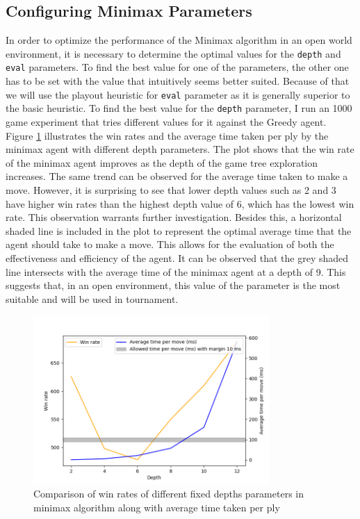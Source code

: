 \subsection{Configuring Minimax Parameters}

In order to optimize the performance of the Minimax algorithm in an open world environment, it is necessary to determine the optimal values for the \texttt{depth} and \texttt{eval} parameters. To find the best value for one of the parameters, the other one has to be set with the value that intuitively seems better suited. Because of that we will use the playout heuristic for \texttt{eval} parameter as it is generally superior to the basic heuristic. To find the best value for the \texttt{depth} parameter, I run an 1000 game experiment that tries different values for it against the Greedy agent. Figure \ref{minimaxOWDepth} illustrates the win rates and the average time taken per ply by the minimax agent with different depth parameters. The plot shows that the win rate of the minimax agent improves as the depth of the game tree exploration increases. The same trend can be observed for the average time taken to make a move. However, it is surprising to see that lower depth values such as 2 and 3 have higher win rates than the highest depth value of 6, which has the lowest win rate. This observation warrants further investigation. Besides this, a horizontal shaded line is included in the plot to represent the optimal average time that the agent should take to make a move. This allows for the evaluation of both the effectiveness and efficiency of the agent. It can be observed that the grey shaded line intersects with the average time of the minimax agent at a depth of 9. This suggests that, in an open environment, this value of the parameter is the most suitable and will be used in tournament. 

\begin{figure}[h]
  \centering
  \captionsetup{justification=centering}
  \includegraphics[width=0.8\textwidth]{../img/minimax_config_openworld.png}
  \caption{Comparison of win rates of different fixed depths parameters in minimax algorithm along with average time taken per ply}
  \label{minimaxOWDepth}
\end{figure}

